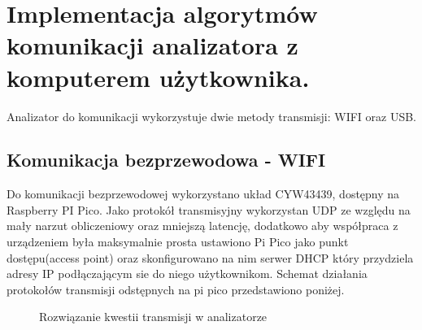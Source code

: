 \section{Implementacja algorytmów komunikacji analizatora z komputerem użytkownika.}
Analizator do komunikacji wykorzystuje dwie metody transmisji: WIFI oraz USB.   

\subsection{Komunikacja bezprzewodowa - WIFI}
    Do komunikacji bezprzewodowej wykorzystano układ CYW43439, dostępny na Raspberry PI Pico. 
    Jako protokół transmisyjny wykorzystan UDP ze względu na mały narzut
    obliczeniowy oraz mniejszą latencję, dodatkowo aby współpraca z urządzeniem była maksymalnie prosta ustawiono Pi Pico
    jako punkt dostępu(access point) oraz skonfigurowano na nim serwer DHCP który przydziela adresy
    IP podłączającym sie do niego użytkownikom. Schemat działania protokołów transmisji
    odstępnych na pi pico przedstawiono poniżej.


\begin{figure}[ht]
    \centering
    \caption{Rozwiązanie kwestii transmisji w analizatorze}
    \label{fig:udp-komunikacja}
\end{figure}



